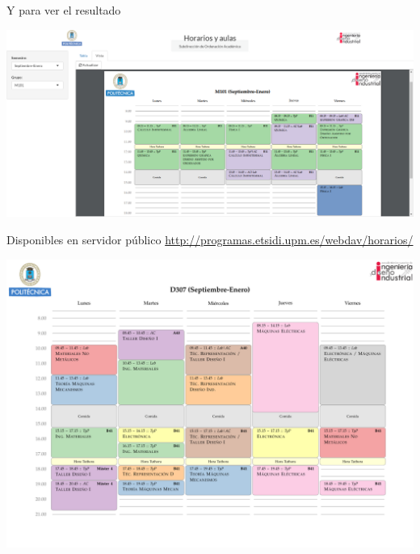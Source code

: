 \documentclass[spanish, xcolor={usenames,svgnames,dvipsnames}]{beamer}
\begin{document}
\begin{frame}[label={sec:org3fdbc52}]{Y para ver el resultado}
\begin{block}{}
\begin{center}
\includegraphics[width=.9\linewidth]{images/horarios_tt.png}
\end{center}
\end{block}
\end{frame}

\begin{frame}[label={sec:org5ae3fd2}]{Disponibles en servidor público}
\url{http://programas.etsidi.upm.es/webdav/horarios/}

\begin{center}
\includegraphics[width=.9\linewidth]{images/D307_1.pdf}
\end{center}
\end{frame}
\end{document}
